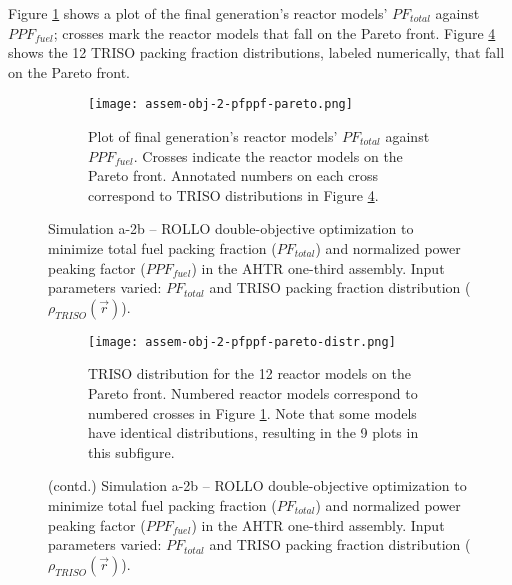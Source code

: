Figure \ref{fig:assem-obj-2-pfppf-pareto} shows a plot of the final generation's reactor 
models' $PF_{total}$ against $PPF_{fuel}$; crosses mark the reactor models that fall on 
the Pareto front.
Figure \ref{fig:assem-obj-2-pfppf-pareto-distr} shows the 12 TRISO packing fraction 
distributions, labeled numerically, that fall on the Pareto front. 
\begin{figure}[htbp!]
    \begin{subfigure}{\textwidth}
        \centering
        \texttt{[image: assem-obj-2-pfppf-pareto.png]}
        \caption{Plot of final generation's reactor models' $PF_{total}$ against 
        $PPF_{fuel}$. 
        Crosses indicate the reactor models on the Pareto front. Annotated numbers 
        on each cross correspond to TRISO distributions in Figure 
        \ref{fig:assem-obj-2-pfppf-pareto-distr}.}
        \label{fig:assem-obj-2-pfppf-pareto} 
    \end{subfigure}
    \caption{Simulation a-2b -- ROLLO double-objective optimization to minimize total fuel 
    packing fraction ($PF_{total}$) and normalized power peaking factor ($PPF_{fuel}$) 
    in the \gls{AHTR} one-third assembly. 
    Input parameters varied: $PF_{total}$ and TRISO 
    packing fraction distribution ($\rho_{TRISO}(\vec{r})$).}
    \label{fig:assem-obj-2-pfppf}
\end{figure}
\begin{figure}[htbp!]
    \ContinuedFloat
    \begin{subfigure}{\textwidth}
        \centering
        \texttt{[image: assem-obj-2-pfppf-pareto-distr.png]}
        \caption{TRISO distribution for the 12 reactor models on the Pareto front.
        Numbered reactor models correspond to numbered crosses in Figure 
        \ref{fig:assem-obj-2-pfppf-pareto}. Note that some models have identical 
        distributions, resulting in the 9 plots in this subfigure.}
        \label{fig:assem-obj-2-pfppf-pareto-distr} 
    \end{subfigure}
    \caption{(contd.) Simulation a-2b -- ROLLO double-objective optimization to minimize total fuel 
    packing fraction ($PF_{total}$) and normalized power peaking factor ($PPF_{fuel}$) 
    in the \gls{AHTR} one-third assembly. 
    Input parameters varied: $PF_{total}$ and TRISO 
    packing fraction distribution ($\rho_{TRISO}(\vec{r})$).}
\end{figure}

